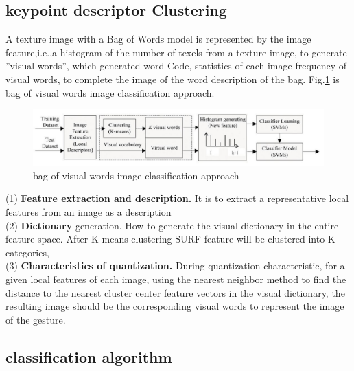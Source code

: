 \subsection{keypoint descriptor Clustering }
A texture image with a Bag of Words
model is represented by the image feature,i.e.,a histogram of
the number of texels from a texture image, to generate ”visual
words”, which generated word Code, statistics of each image
frequency of visual words, to complete the image of the word
description of the bag. Fig.\ref{fig:bag} is bag of visual words image
classiﬁcation approach.\\
\begin{figure}[H]
\centering
\includegraphics[width=1.0\textwidth]{img/BAG.jpg}
\caption{ bag of visual words image classification approach   }
\label{fig:bag}
\end{figure}
(1) \textbf{Feature extraction and description.} It is to extract a representative local features from an image as a description   \\(2)\textbf{ Dictionary}
generation. How to generate the visual dictionary in the
entire feature space. After K-means clustering SURF 
feature will be clustered into K categories,\\(3)\textbf{ Characteristics of quantization.} During
quantization characteristic, for a given local features of each
image, using the nearest neighbor method to find the distance
to the nearest cluster center feature vectors in the visual
dictionary, the resulting image should be the corresponding
visual words to represent the image of the gesture.


\subsection{classification algorithm }

